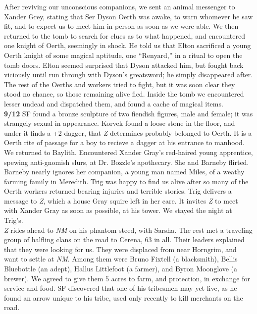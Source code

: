 \documentclass[letterpaper]{article}
\begin{document}
\noindent After reviving our unconscious companions, we sent an animal messenger to Xander Grey, stating that Ser Dyson Oerth was awake, to warn whomever he saw fit, and to expect us to meet him in person as soon as we were able.  We then returned to the tomb to search for clues as to what happened, and encountered one knight of Oerth, seemingly in shock.  He told us that Elton sacrificed a young Oerth knight of some magical aptitude, one ``Renyard,'' in a ritual to open the tomb doors.  Elton seemed surprised that Dyson attacked him, but fought back viciously until run through with Dyson's greatsword; he simply disappeared after.  The rest of the Oerths and workers tried to fight, but it was soon clear they stood no chance, so those remaining alive fled.  Inside the tomb we encountered lesser undead and dispatched them, and found a cache of magical items. \\

\noindent \textbf{9/12} SF found a bronze sculpture of two fiendish figures, male and female; it was strangely sexual in appearance. Korvek found a loose stone in the floor, and under it finds a +2 dagger, that \emph{Z} determines probably belonged to Oerth.  It is a Oerth rite of passage for a boy to recieve a dagger at his entrance to manhood.  \\

\noindent We returned to Baylith.  Encountered Xander Gray's red-haired young apprentice, spewing anti-gnomish slurs, at Dr. Bozzle's apothecary.  She and Barneby flirted.  Barneby nearly ignores her companion, a young man named Miles, of a weathy farming family in Meredith. Trig was happy to find us alive after so many of the Oerth workers returned bearing injuries and terrible stories.  Trig delivers a message to \emph{Z}, which a house Gray squire left in her care.  It invites \emph{Z} to meet with Xander Gray as soon as possible, at his tower.  We stayed the night at Trig's.\\

\noindent \emph{Z} rides ahead to \emph{NM} on his phantom steed, with Sarsha. The rest met a traveling group of halfling clans on the road to Cerena, 63 in all. Their leaders explained that they were looking for us.  They were displaced from near Horngrim, and want to settle at \emph{NM}.  Among them were Bruno Fixtell (a blacksmith), Bellis Bluebottle (an adept), Hallus Littlefoot (a farmer), and Byron Moonglove (a brewer).  We agreed to give them 5 acres to farm, and protection, in exchange for service and food.  SF discovered that one of his tribesmen may yet live, as he found an arrow unique to his tribe, used only recently to kill merchants on the road.\\
\end{document}
